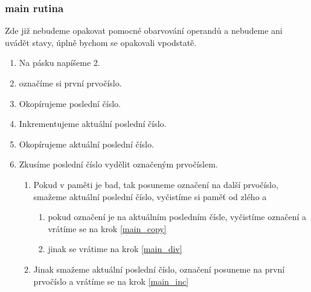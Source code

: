 \documentclass[a4paper,12pt]{article} %
\begin{document}
\subsubsection*{main rutina}

Zde již nebudeme opakovat pomocné obarvování operandů a nebudeme ani uvádět stavy, úplně bychom se opakovali vpodstatě.

\begin{enumerate}
    \item Na pásku napíšeme 2.
    \item \label{main_copy} označíme si první prvočíslo.
    \item Okopírujeme poslední číslo.
    \item \label{main_inc} Inkrementujeme aktuální poslední číslo.
    \item \label{main_div} Okopírujeme aktuální poslední číslo.
    \item Zkusíme poslední číslo vydělit označeným prvočíslem.
    \begin{enumerate}
        \item Pokud v paměti je bad, tak posuneme označení na další prvočíslo, smažeme aktuální poslední číslo, vyčistíme si paměť od zlého a
        \begin{enumerate}
            \item pokud označení je na aktuálním posledním čísle, vyčistíme označení a vrátíme se na krok \ref{main_copy}
            \item jinak se vrátime na krok \ref{main_div}
        \end{enumerate}
        \item Jinak smažeme aktuální poslední číslo, označení posuneme na první prvočíslo a vrátíme se na krok \ref{main_inc}
    \end{enumerate}
\end{enumerate}
\end{document}
